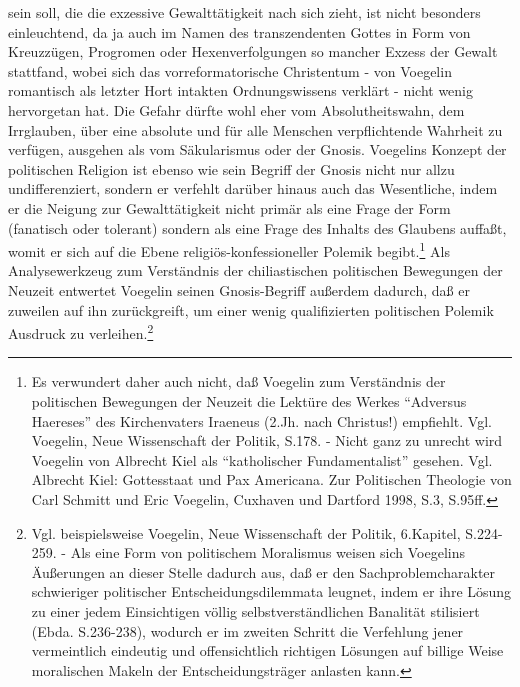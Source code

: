 sein soll, die die exzessive Gewalttätigkeit nach sich zieht, ist nicht
besonders einleuchtend, da ja auch im Namen des transzendenten Gottes in Form
von Kreuzzügen, Progromen oder Hexenverfolgungen so mancher Exzess der Gewalt
stattfand, wobei sich das vorreformatorische Christentum - von Voegelin
romantisch als letzter Hort intakten Ordnungswissens verklärt - nicht wenig
hervorgetan hat. Die Gefahr dürfte wohl eher vom Absolutheitswahn, dem
Irrglauben, über eine absolute und für alle Menschen verpflichtende Wahrheit
zu verfügen, ausgehen als vom Säkularismus oder der Gnosis. Voegelins Konzept
der politischen Religion ist ebenso wie sein Begriff der Gnosis nicht nur
allzu undifferenziert, sondern er verfehlt darüber hinaus auch das
Wesentliche, indem er die Neigung zur Gewalttätigkeit nicht primär als eine
Frage der Form (fanatisch oder tolerant) sondern als eine Frage des Inhalts
des Glaubens auf\/faßt, womit er sich auf die Ebene religiös-konfessioneller
Polemik begibt.\footnote{Es verwundert daher auch nicht, daß Voegelin zum
  Verständnis der politischen Bewegungen der Neuzeit die Lektüre des Werkes
  "`Adversus Haereses"' des Kirchenvaters Iraeneus (2.Jh. nach Christus!)
  empfiehlt.  Vgl. Voegelin, Neue Wissenschaft der Politik, S.178. - Nicht
  ganz zu unrecht wird Voegelin von Albrecht Kiel als "`katholischer
  Fundamentalist"' gesehen. Vgl.  Albrecht Kiel: Gottesstaat und Pax
  Americana. Zur Politischen Theologie von Carl Schmitt und Eric Voegelin,
  Cuxhaven und Dartford 1998, S.3, S.95ff.}  Als Analysewerkzeug zum
Verständnis der chiliastischen politischen Bewegungen der Neuzeit entwertet
Voegelin seinen Gnosis-Begriff außerdem dadurch, daß er zuweilen auf ihn
zurückgreift, um einer wenig qualifizierten politischen Polemik Ausdruck zu
verleihen.\footnote{Vgl. beispielsweise Voegelin, Neue Wissenschaft der
  Politik, 6.Kapitel, S.224-259. - Als eine Form von politischem Moralismus
  weisen sich Voegelins Äußerungen an dieser Stelle dadurch aus, daß er den
  Sachproblemcharakter schwieriger politischer Entscheidungsdilemmata leugnet,
  indem er ihre Lösung zu einer jedem Einsichtigen völlig selbstverständlichen
  Banalität stilisiert (Ebda.  S.236-238), wodurch er im zweiten Schritt die
  Verfehlung jener vermeintlich eindeutig und offensichtlich richtigen
  Lösungen auf billige Weise moralischen Makeln der Entscheidungsträger
  anlasten kann.}



